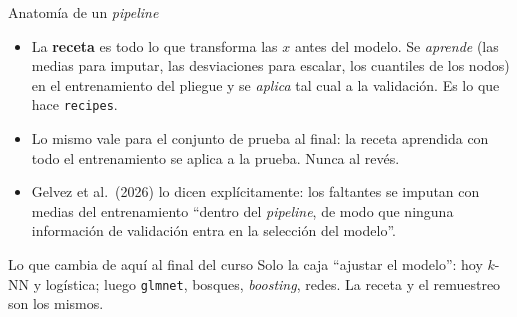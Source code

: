 \documentclass{beamer}
\newcommand{\1}{\mathbb{I}}
\begin{document}
\begin{frame}{Anatomía de un \emph{pipeline}}
\small
\begin{center}
\end{center}
\pause
\begin{itemize}\itemsep3pt
  \item La \textbf{receta} es todo lo que transforma las $x$ antes del modelo. Se \emph{aprende} (las medias para imputar, las desviaciones para escalar, los cuantiles de los nodos) en el entrenamiento del pliegue y se \emph{aplica} tal cual a la validación. Es lo que hace \texttt{recipes}. \pause
  \item Lo mismo vale para el conjunto de prueba al final: la receta aprendida con todo el entrenamiento se aplica a la prueba. Nunca al revés. \pause
  \item Gelvez et al.\ (2026) lo dicen explícitamente: los faltantes se imputan con medias del entrenamiento ``dentro del \emph{pipeline}, de modo que ninguna información de validación entra en la selección del modelo''.
\end{itemize}
\pause
\begin{block}{Lo que cambia de aquí al final del curso}
Solo la caja ``ajustar el modelo'': hoy $k$-NN y logística; luego \texttt{glmnet}, bosques, \emph{boosting}, redes. La receta y el remuestreo son los mismos.
\end{block}
\end{frame}
\end{document}
